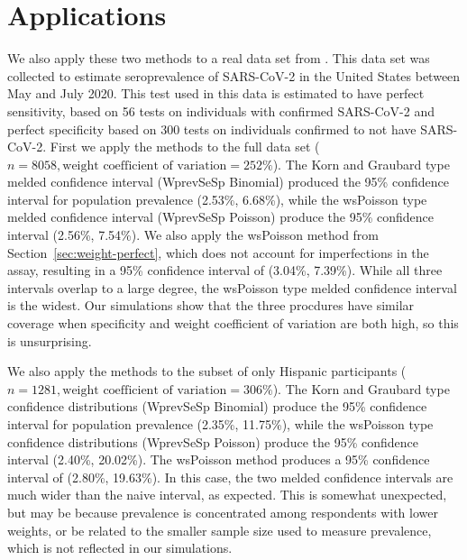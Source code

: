 \documentclass[AMA,STIX1COL]{WileyNJD-v2}
\begin{document}
\section{Applications}

We also apply these two methods to a real data set from \cite{Kali:2021}.
This data set was collected to estimate seroprevalence of SARS-CoV-2 in the United States between May and July 2020.
This test used in this data is estimated to have perfect sensitivity, based on 56 tests on individuals with confirmed SARS-CoV-2 and perfect specificity based on 300 tests on individuals confirmed to not have SARS-CoV-2.
First we apply the methods to the full data set (\( n =  8058, \text{weight coefficient of variation} = 252\%\)).
The Korn and Graubard type melded confidence interval (WprevSeSp Binomial) produced the 95\% confidence interval for population prevalence (2.53\%, 6.68\%), while the wsPoisson type melded confidence interval (WprevSeSp Poisson) produce the 95\% confidence interval (2.56\%, 7.54\%).
We also apply the wsPoisson method from Section~\ref{sec:weight-perfect}, which does not account for imperfections in the assay, resulting in a 95\% confidence interval of (3.04\%, 7.39\%).
While all three intervals overlap to a large degree, the wsPoisson type melded confidence interval is the widest.
Our simulations show that the three procdures have similar coverage when specificity and weight coefficient of variation are both high, so this is unsurprising.


We also apply the methods to the subset of only Hispanic participants (\( n = 1281, \text{weight coefficient of variation} = 306\% \)).
The Korn and Graubard type confidence distributions (WprevSeSp Binomial) produce the 95\% confidence interval for population prevalence (2.35\%, 11.75\%), while the wsPoisson type confidence distributions (WprevSeSp Poisson) produce the 95\% confidence interval (2.40\%, 20.02\%).
The wsPoisson method produces a 95\% confidence interval of (2.80\%, 19.63\%).
In this case, the two melded confidence intervals are much wider than the naive interval, as expected.
This is somewhat unexpected, but may be because prevalence is concentrated among respondents with lower weights, or be related to the smaller sample size used to measure prevalence, which is not reflected in our simulations.

\pagebreak

\end{document}
